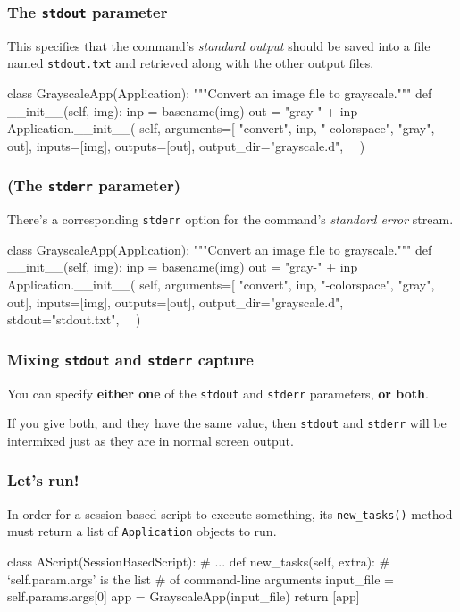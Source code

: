 \documentclass[english,serif,mathserif,xcolor=pdftex,dvipsnames,table]{beamer}
\begin{document}
\begin{frame}[fragile]
\frametitle{The \texttt{stdout} parameter}

This specifies that the command's \emph{standard output} should be
saved into a file named \texttt{stdout.txt} and retrieved along with
the other output files.

  \+
\begin{python}
class GrayscaleApp(Application):
  """Convert an image file to grayscale."""
  def __init__(self, img):
    inp = basename(img)
    out = "gray-" + inp
    Application.__init__(
      self,
      arguments=[
        "convert", inp, "-colorspace", "gray", out],
      inputs=[img],
      outputs=[out],
      output_dir="grayscale.d",
      ~~)
\end{python}
\end{frame}


\begin{frame}[fragile]
\frametitle{(The \texttt{stderr} parameter)}

There's a corresponding \texttt{stderr} option for the command's
\emph{standard error} stream.

\begin{python}
class GrayscaleApp(Application):
  """Convert an image file to grayscale."""
  def __init__(self, img):
    inp = basename(img)
    out = "gray-" + inp
    Application.__init__(
      self,
      arguments=[
        "convert", inp, "-colorspace", "gray", out],
      inputs=[img],
      outputs=[out],
      output_dir="grayscale.d",
      stdout="stdout.txt",
      ~~)
\end{python}
\end{frame}


\begin{frame}
  \frametitle{Mixing \texttt{stdout} and \texttt{stderr} capture}

  You can specify \textbf{either one} of the \texttt{stdout} and
  \texttt{stderr} parameters, \textbf{or both}.

  \+
  If you give both, and they have the same value, then
  \texttt{stdout} and \texttt{stderr} will be intermixed just as they
  are in normal screen output.
\end{frame}


\begin{frame}[fragile]
  \frametitle{Let's run!}
  In order for a session-based script to execute something, its
  \texttt{new\_tasks()} method must return a list of
  \texttt{Application} objects to run.

\+
\begin{python}
class AScript(SessionBasedScript):
  # ...
  def new_tasks(self, extra):
    # `self.param.args' is the list
    # of command-line arguments
    input_file = self.params.args[0]
    app = GrayscaleApp(input_file)
    return [app]
\end{python}
\end{frame}
\end{document}
